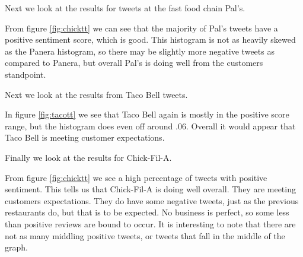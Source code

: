 \documentclass[titlepage,letterpaper]{article}
\begin{document}
Next we look at the results for tweets at the fast food chain Pal's.



From figure \cref{fig:chicktt} we can see that the majority of Pal's tweets have a positive sentiment score, which is good. This histogram is not as heavily skewed as the Panera histogram, so there may be slightly more negative tweets as compared to Panera, but overall Pal's is doing well from the customers standpoint. 

Next we look at the results from Taco Bell tweets.



In figure \cref{fig:tacott} we see that Taco Bell again is mostly in the positive score range, but the histogram does even off around $.06$. Overall it would appear that Taco Bell is meeting customer expectations. 

Finally we look at the results for Chick-Fil-A.


%

From figure \cref{fig:chicktt} we see a high percentage of tweets with positive sentiment. This tells us that Chick-Fil-A is doing well overall. They are meeting customers expectations. They do have some negative tweets, just as the previous restaurants do, but that is to be expected. No business is perfect, so some less than positive reviews are bound to occur. It is interesting to note that there are not as many middling positive tweets, or tweets that fall in the middle of the graph.


\newpage


\end{document}
